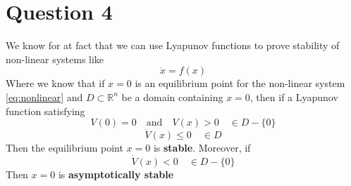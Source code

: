 \chapter{Question 4}
We know for at fact that we can use Lyapunov functions to prove stability of non-linear systems like
\begin{equation}
        \dot{x} = f(x)
        \label{eq:nonlinear}
\end{equation}
Where we know that if $x = 0$ is an equilibrium point for the non-linear system \ref{eq:nonlinear} and $D \subset \mathbb{R}^n$ be a domain containing $x = 0$, then if a Lyapunov function satisfying
\begin{equation}
        V(0) = 0 \quad \text{and} \quad V(x) > 0 \quad \in D - \{0\}
\end{equation}
\begin{equation}
        \dot{V}(x) \leq 0 \quad \in D
\end{equation}
Then the equilibrium point $x = 0$ is \textbf{stable}. Moreover, if
\begin{equation}
        \dot{V}(x) < 0 \quad \in D - \{0\}
\end{equation}
Then $x = 0$ is \textbf{asymptotically stable}